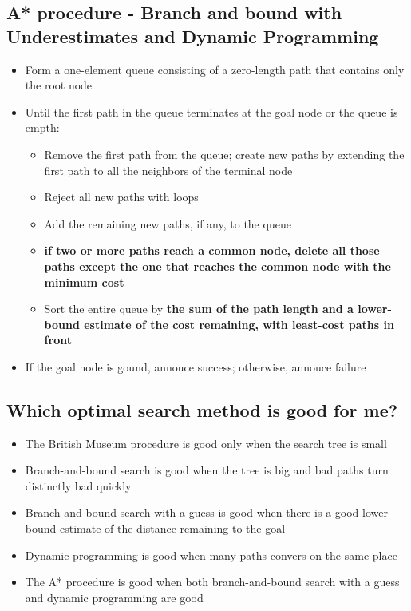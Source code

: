 \documentclass{article}
\begin{document}
\subsection{A* procedure - Branch and bound with Underestimates
and Dynamic Programming}

\begin{itemize}
  \item Form a one-element queue consisting of a zero-length path 
    that contains only the root node
  \item Until the first path in the queue terminates at the 
    goal node or the queue is empth:
    \begin{itemize}
      \item Remove the first path from the queue; create new paths 
        by extending the first path to all the neighbors
        of the terminal node
      \item Reject all new paths with loops
      \item Add the remaining new paths, if any, to the queue
      \item \textbf{if two or more paths reach a common node,
        delete all those paths except the one that reaches the
        common node with the minimum cost}
      \item Sort the entire queue by \textbf{the sum of the path
        length and a lower-bound estimate of the cost
        remaining, with least-cost paths in front}
    \end{itemize}
  \item If the goal node is gound, annouce success; otherwise, 
    annouce failure
\end{itemize}

\subsection{Which optimal search method is good for me?}
\begin{itemize}
  \item The British Museum procedure is good only when the 
    search tree is small
  \item Branch-and-bound search is good when the tree is big 
    and bad paths turn distinctly bad quickly
  \item Branch-and-bound search with a guess is good when 
    there is a good lower-bound estimate of the distance
    remaining to the goal
  \item Dynamic programming is good when many paths convers
    on the same place
  \item The A* procedure is good when both branch-and-bound 
    search with a guess and dynamic programming are good
\end{itemize}
\end{document}

